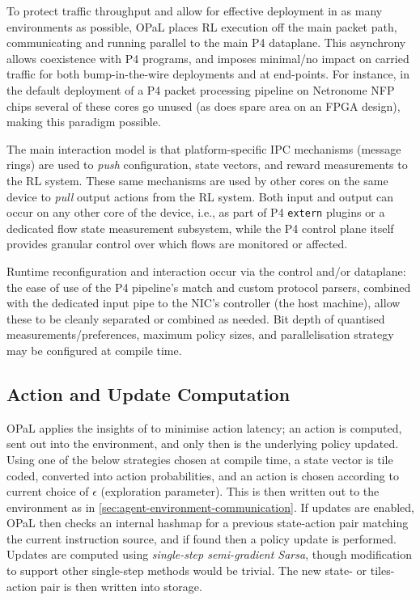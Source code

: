 \documentclass[sigconf,natbib=false]{acmart}
\newcommand{\approachshort}{OPaL}
\begin{document}

To protect traffic throughput and allow for effective deployment in as many environments as possible, \approachshort{} places RL execution off the main packet path, communicating and running parallel to the main P4 dataplane.
This asynchrony allows coexistence with P4 programs, and imposes minimal/no impact on carried traffic for both bump-in-the-wire deployments and at end-points.
For instance, in the default deployment of a P4 packet processing pipeline on Netronome NFP chips several of these cores go unused (as does spare area on an FPGA design), making this paradigm possible.

The main interaction model is that platform-specific IPC mechanisms (message rings) are used to \emph{push} configuration, state vectors, and reward measurements to the RL system.
These same mechanisms are used by other cores on the same device to \emph{pull} output actions from the RL system.
Both input and output can occur on any other core of the device, i.e., as part of P4 \texttt{extern} plugins or a dedicated flow state measurement subsystem, while the P4 control plane itself provides granular control over which flows are monitored or affected.

Runtime reconfiguration and interaction occur via the control and/or dataplane: the ease of use of the P4 pipeline's match and custom protocol parsers, combined with the dedicated input pipe to the NIC's controller (the host machine), allow these to be cleanly separated or combined as needed.
Bit depth of quantised measurements/preferences, maximum policy sizes, and parallelisation strategy may be configured at compile time.

\subsection{Action and Update Computation}
\approachshort{} applies the insights of \textcite{DBLP:journals/firai/TravnikMSP18} to minimise action latency; an action is computed, sent out into the environment, and only then is the underlying policy updated.
Using one of the below strategies chosen at compile time, a state vector is tile coded, converted into action probabilities, and an action is chosen according to current choice of $\epsilon$ (exploration parameter).
This is then written out to the environment as in \cref{sec:agent-environment-communication}.
If updates are enabled, \approachshort{} then checks an internal hashmap for a previous state-action pair matching the current instruction source, and if found then a policy update is performed.
Updates are computed using \emph{single-step semi-gradient Sarsa}, though modification to support other single-step methods would be trivial.
The new state- or tiles-action pair is then written into storage.
\end{document}
